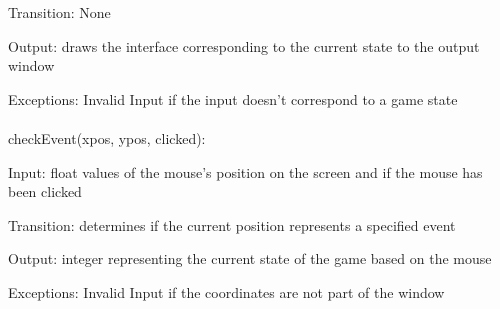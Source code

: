 \documentclass[12pt, titlepage]{article}
\begin{document}
		Transition: None
		
		Output: draws the interface corresponding to the current state to the output window
		
		Exceptions: Invalid Input if the input doesn't correspond to a game state\\
		\\
		checkEvent(xpos, ypos, clicked):
		
		Input: float values of the mouse's position on the screen and if the mouse has been clicked
		
		Transition: determines if the current position represents a specified event
		
		Output: integer representing the current state of the game based on the mouse
		
		Exceptions: Invalid Input if the coordinates are not part of the window
		
		
		
		
		

		
\end{document}
